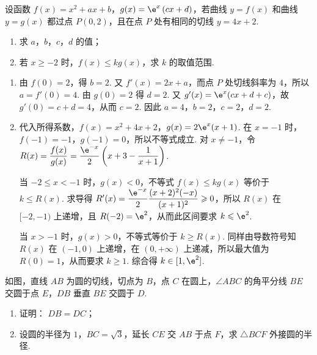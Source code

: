 \begin{problem}
设函数 \(f(x) = x^2 + ax + b\)，\(g(x) = \e^x\left(cx + d\right)\)，若曲线 \(y = f(x)\) 和曲线 \(y = g(x)\) 都过点 \(P\left(0,2\right)\)，且在点 \(P\) 处有相同的切线 \(y = 4x + 2\).
\begin{enumerate}
\item 求 \(a\)，\(b\)，\(c\)，\(d\) 的值；
\item 若 \(x \geqslant -2\) 时，\(f(x) \leqslant kg(x)\)，求 \(k\) 的取值范围.
\end{enumerate}
\end{problem}

\begin{solution}
\begin{enumerate}
\item 由 \(f(0)=2\)，得 \(b=2\). 又 \(f'(x)=2x+a\)，而点 \(P\) 处切线斜率为 \(4\)，所以 \(a=f'(0)=4\). 由 \(g(0)=2\) 得 \(d=2\). 又
\(g'(x)=\e^x(cx+d+c)\)，故 \(g'(0)=c+d=4\)，从而 \(c=2\). 因此 \(a=4\)，\(b=2\)，\(c=2\)，\(d=2\).

\item 代入所得系数，\(f(x)=x^2+4x+2\)，\(g(x)=2\e^x(x+1)\). 在 \(x=-1\) 时，\(f(-1)=-1\)，\(g(-1)=0\)，所以不等式成立. 对 \(x\neq-1\)，令
\(R(x)=\dfrac{f(x)}{g(x)}=\dfrac{\e^{-x}}2\left(x+3-\dfrac1{x+1}\right)\).

当 \(-2\leqslant x<-1\) 时，\(g(x)<0\)，不等式 \(f(x)\leqslant kg(x)\) 等价于 \(k\leqslant R(x)\). 求导得
\(R'(x)=\dfrac{\e^{-x}}2\dfrac{(x+2)^2(-x)}{(x+1)^2}\geqslant0\)，所以 \(R(x)\) 在 \([-2,-1)\) 上递增，且 \(R(-2)=\e^2\)，从而此区间要求 \(k\leqslant\e^2\).

当 \(x>-1\) 时，\(g(x)>0\)，不等式等价于 \(k\geqslant R(x)\). 同样由导数符号知 \(R(x)\) 在 \((-1,0)\) 上递增，在 \((0,+\infty)\) 上递减，所以最大值为 \(R(0)=1\)，从而要求 \(k\geqslant1\). 综合得 \(k\in[1,\e^2]\).
\end{enumerate}
\end{solution}

\begin{problem}
如图，直线 \(AB\) 为圆的切线，切点为 \(B\)，点 \(C\) 在圆上，\(\angle ABC\) 的角平分线 \(BE\) 交圆于点 \(E\)，\(DB\) 垂直 \(BE\) 交圆于 \(D\).

\begin{enumerate}
\item 证明： \(DB = DC\)；
\item 设圆的半径为 \(1\)，\(BC = \sqrt{3}\)，延长 \(CE\) 交 \(AB\) 于点 \(F\)，求 \(\triangle BCF\) 外接圆的半径.
\end{enumerate}

\end{problem}

